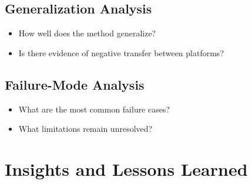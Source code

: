 \documentclass[letterpaper,10pt,conference]{ieeeconf}
\begin{document}
\subsection{Generalization Analysis}

\begin{itemize}
    \item How well does the method generalize?
    \item Is there evidence of negative transfer between platforms?
\end{itemize}

\subsection{Failure-Mode Analysis}

\begin{itemize}
    \item What are the most common failure cases?
    \item What limitations remain unresolved?
\end{itemize}

\section{Insights and Lessons Learned}
\label{sec:insights}
\end{document}
